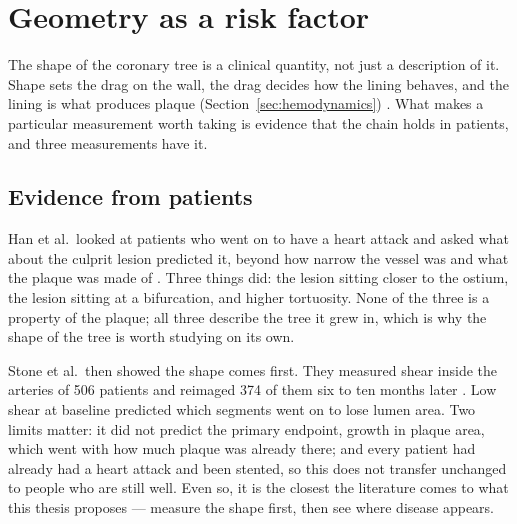 %
%

\section{Geometry as a risk factor}
\label{sec:geometry}

The shape of the coronary tree is a clinical quantity, not just a description of it.
Shape sets the drag on the wall, the drag decides how the lining behaves, and the lining is what
produces plaque (Section~\ref{sec:hemodynamics}) \cite{rampidis2022geometry}.
What makes a particular measurement worth taking is evidence that the chain holds in patients, and
three measurements have it.

\subsection{Evidence from patients}

Han et al.\ looked at patients who went on to have a heart attack and asked what about the culprit
lesion predicted it, beyond how narrow the vessel was and what the plaque was made of
\cite{han2022plaque}.
Three things did: the lesion sitting closer to the ostium, the lesion sitting at a bifurcation, and
higher tortuosity.
None of the three is a property of the plaque; all three describe the tree it grew in, which is
why the shape of the tree is worth studying on its own.

Stone et al.\ then showed the shape comes first.
They measured shear inside the arteries of 506 patients and reimaged 374 of them six to ten months
later \cite{stone2012prediction}.
Low shear at baseline predicted which segments went on to lose lumen area.
Two limits matter: it did not predict the primary endpoint, growth in plaque area, which went with
how much plaque was already there; and every patient had already had a heart attack and been
stented, so this does not transfer unchanged to people who are still well.
Even so, it is the closest the literature comes to what this thesis proposes --- measure the shape
first, then see where disease appears.

